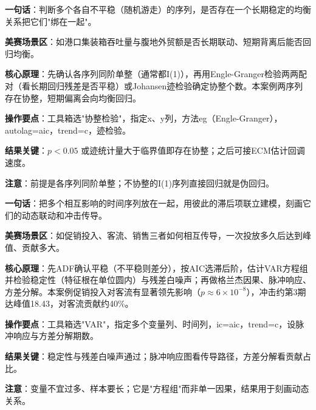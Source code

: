 \begin{algobrief}
\textbf{一句话}：判断多个各自不平稳（随机游走）的序列，是否存在一个长期稳定的均衡关系把它们"绑在一起"。

\textbf{美赛场景区}：如港口集装箱吞吐量与腹地外贸额是否长期联动、短期背离后能否回归均衡。

\textbf{核心原理}：先确认各序列同阶单整（通常都I(1)），再用Engle-Granger检验两两配对（看长期回归残差是否平稳）或Johansen迹检验确定协整个数。本案例两序列存在协整，短期偏离会向均衡回归。

\textbf{操作要点}：工具箱选"协整检验"，指定x、y列，方法eg（Engle-Granger），autolag=aic，trend=c，迹检验。

\textbf{结果关键}：$p<0.05$ 或迹统计量大于临界值即存在协整；之后可接ECM估计回调速度。

\textbf{注意}：前提是各序列同阶单整；不协整的I(1)序列直接回归就是伪回归。
\end{algobrief}


\begin{algobrief}
\textbf{一句话}：把多个相互影响的时间序列放在一起，用彼此的滞后项联立建模，刻画它们的动态联动和冲击传导。

\textbf{美赛场景区}：如促销投入、客流、销售三者如何相互传导，一次投放多久后达到峰值、贡献多大。

\textbf{核心原理}：先ADF确认平稳（不平稳则差分），按AIC选滞后阶，估计VAR方程组并检验稳定性（特征根在单位圆内）与残差白噪声；再做格兰杰因果、脉冲响应、方差分解。本案例促销投入对客流有显著领先影响（$p\approx6\times10^{-8}$），冲击约第3期达峰值18.43，对客流贡献约40\%。

\textbf{操作要点}：工具箱选"VAR"，指定多个变量列、时间列，ic=aic，trend=c，设脉冲响应与方差分解期数。

\textbf{结果关键}：稳定性与残差白噪声通过；脉冲响应图看传导路径，方差分解看贡献占比。

\textbf{注意}：变量不宜过多、样本要长；它是"方程组"而非单一因果，结果用于刻画动态关系。
\end{algobrief}


